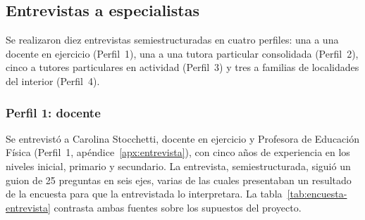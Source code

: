 \subsection{Entrevistas a especialistas}

Se realizaron diez entrevistas semiestructuradas en cuatro perfiles:
una a una docente en ejercicio (Perfil~1), una a una tutora particular
consolidada (Perfil~2), cinco a tutores particulares en actividad
(Perfil~3) y tres a familias de localidades del interior (Perfil~4).

\subsubsection{Perfil 1: docente}

Se entrevistó a Carolina Stocchetti, docente en ejercicio y Profesora de
Educación Física (Perfil~1, apéndice~\ref{apx:entrevista}), con cinco años de experiencia en los
niveles inicial, primario y secundario. La entrevista, semiestructurada, siguió un guion de
25 preguntas en seis ejes, varias de las cuales presentaban un resultado
de la encuesta para que la entrevistada lo interpretara. La
tabla~\ref{tab:encuesta-entrevista} contrasta ambas fuentes sobre los
supuestos del proyecto.

